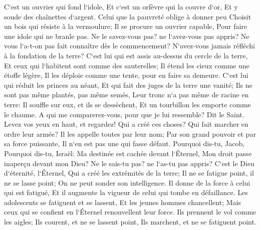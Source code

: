 \verse C`est un ouvrier qui fond l`idole, Et c`est un orfèvre qui la couvre d`or, Et y soude des chaînettes d`argent. 
\verse Celui que la pauvreté oblige à donner peu Choisit un bois qui résiste à la vermoulure; Il se procure un ouvrier capable, Pour faire une idole qui ne branle pas. 
\verse Ne le savez-vous pas? ne l`avez-vous pas appris? Ne vous l`a-t-on pas fait connaître dès le commencement? N`avez-vous jamais réfléchi à la fondation de la terre? 
\verse C`est lui qui est assis au-dessus du cercle de la terre, Et ceux qui l`habitent sont comme des sauterelles; Il étend les cieux comme une étoffe légère, Il les déploie comme une tente, pour en faire sa demeure. 
\verse C`est lui qui réduit les princes au néant, Et qui fait des juges de la terre une vanité; 
\verse Ils ne sont pas même plantés, pas même semés, Leur tronc n`a pas même de racine en terre: Il souffle sur eux, et ils se dessèchent, Et un tourbillon les emporte comme le chaume. 
\verse A qui me comparerez-vous, pour que je lui ressemble? Dit le Saint. 
\verse Levez vos yeux en haut, et regardez! Qui a créé ces choses? Qui fait marcher en ordre leur armée? Il les appelle toutes par leur nom; Par son grand pouvoir et par sa force puissante, Il n`en est pas une qui fasse défaut. 
\verse Pourquoi dis-tu, Jacob, Pourquoi dis-tu, Israël: Ma destinée est cachée devant l`Éternel, Mon droit passe inaperçu devant mon Dieu? 
\verse Ne le sais-tu pas? ne l`as-tu pas appris? C`est le Dieu d`éternité, l`Éternel, Qui a créé les extrémités de la terre; Il ne se fatigue point, il ne se lasse point; On ne peut sonder son intelligence. 
\verse Il donne de la force à celui qui est fatigué, Et il augmente la vigueur de celui qui tombe en défaillance. 
\verse Les adolescents se fatiguent et se lassent, Et les jeunes hommes chancellent; 
\verse Mais ceux qui se confient en l`Éternel renouvellent leur force. Ils prennent le vol comme les aigles; Ils courent, et ne se lassent point, Ils marchent, et ne se fatiguent point. 

